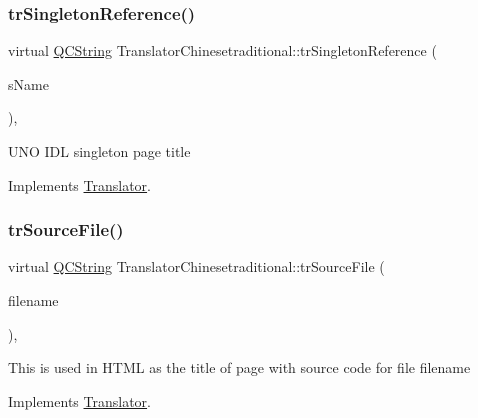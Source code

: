 \mbox{\label{class_translator_chinesetraditional_a1e77bfd70f909c07ca8228c1338290ea}} 
\subsubsection{\texorpdfstring{trSingletonReference()}{trSingletonReference()}}
{\footnotesize\ttfamily virtual \mbox{\hyperlink{class_q_c_string}{Q\+C\+String}} Translator\+Chinesetraditional\+::tr\+Singleton\+Reference (\begin{DoxyParamCaption}\item[{const char $\ast$}]{s\+Name }\end{DoxyParamCaption})\hspace{0.3cm}{\ttfamily [inline]}, {\ttfamily [virtual]}}

U\+NO I\+DL singleton page title 

Implements \mbox{\hyperlink{class_translator}{Translator}}.

\mbox{\label{class_translator_chinesetraditional_aead901c951de5396b578db9364fc45b4}} 
\subsubsection{\texorpdfstring{trSourceFile()}{trSourceFile()}}
{\footnotesize\ttfamily virtual \mbox{\hyperlink{class_q_c_string}{Q\+C\+String}} Translator\+Chinesetraditional\+::tr\+Source\+File (\begin{DoxyParamCaption}\item[{\mbox{\hyperlink{class_q_c_string}{Q\+C\+String}} \&}]{filename }\end{DoxyParamCaption})\hspace{0.3cm}{\ttfamily [inline]}, {\ttfamily [virtual]}}

This is used in H\+T\+ML as the title of page with source code for file filename 

Implements \mbox{\hyperlink{class_translator}{Translator}}.

